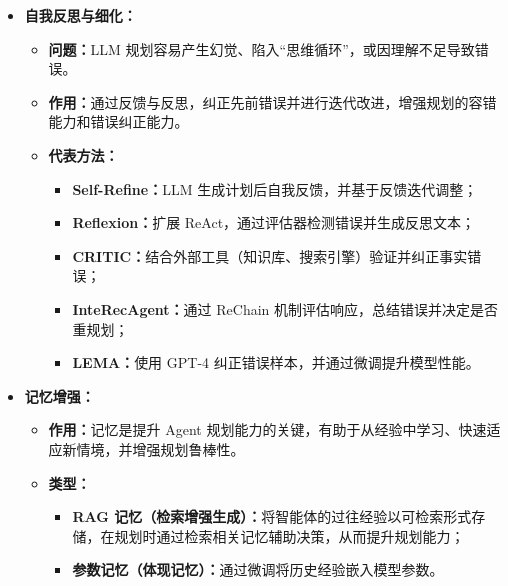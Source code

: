 \documentclass[../main.tex]{subfiles}
\begin{document}
\begin{enumerate}
\begin{itemize}
            \item \textbf{自我反思与细化：}
            \begin{itemize}
                \item \textbf{问题：}LLM 规划容易产生幻觉、陷入“思维循环”，或因理解不足导致错误。
                \item \textbf{作用：}通过反馈与反思，纠正先前错误并进行迭代改进，增强规划的容错能力和错误纠正能力。
                \item \textbf{代表方法：}
                \begin{itemize}
                    \item \textbf{Self-Refine：}LLM 生成计划后自我反馈，并基于反馈迭代调整；
                    \item \textbf{Reflexion：}扩展 ReAct，通过评估器检测错误并生成反思文本；
                    \item \textbf{CRITIC：}结合外部工具（知识库、搜索引擎）验证并纠正事实错误；
                    \item \textbf{InteRecAgent：}通过 ReChain 机制评估响应，总结错误并决定是否重规划；
                    \item \textbf{LEMA：}使用 GPT-4 纠正错误样本，并通过微调提升模型性能。
                \end{itemize}
            \end{itemize}

            \item \textbf{记忆增强：}
            \begin{itemize}
                \item \textbf{作用：}记忆是提升 Agent 规划能力的关键，有助于从经验中学习、快速适应新情境，并增强规划鲁棒性。
                \item \textbf{类型：}
                \begin{itemize}
                    \item \textbf{RAG 记忆（检索增强生成）：}将智能体的过往经验以可检索形式存储，在规划时通过检索相关记忆辅助决策，从而提升规划能力；
                    \item \textbf{参数记忆（体现记忆）：}通过微调将历史经验嵌入模型参数。
                \end{itemize}
            \end{itemize}


\end{itemize}
\end{enumerate}
\end{document}
